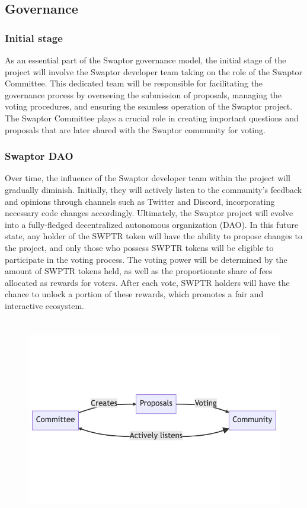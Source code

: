 \documentclass[12pt]{article}
\begin{document}
\subsection{Governance}

\subsubsection{Initial stage}
As an essential part of the Swaptor governance model, the initial stage of the project will
involve the Swaptor developer team taking on the role of the Swaptor Committee. This dedicated
team will be responsible for facilitating the governance process by overseeing the submission of proposals,
managing the voting procedures, and ensuring the seamless operation of the Swaptor project.
The Swaptor Committee plays a crucial role in creating important questions and proposals that are later shared
with the Swaptor community for voting.

\subsubsection{Swaptor DAO}
Over time, the influence of the Swaptor developer team within the project will gradually diminish.
Initially, they will actively listen to the community's feedback and opinions through channels such as Twitter and Discord,
incorporating necessary code changes accordingly. Ultimately, the Swaptor project will evolve into a fully-fledged
decentralized autonomous organization (DAO). In this future state, any holder of the SWPTR token will have the
ability to propose changes to the project, and only those who possess SWPTR tokens will be eligible to participate
in the voting process. The voting power will be determined by the amount of SWPTR tokens held, as well as the proportionate
share of fees allocated as rewards for voters. After each vote, SWPTR holders will have the chance to unlock a portion of these rewards,
which promotes a fair and interactive ecosystem.


\begin{figure}[h]
  \centering
  \includegraphics[width=18cm,height=8.8cm,keepaspectratio=true]{governance.png}
  \label{fig:docvsnur}
\end{figure}
\end{document}
